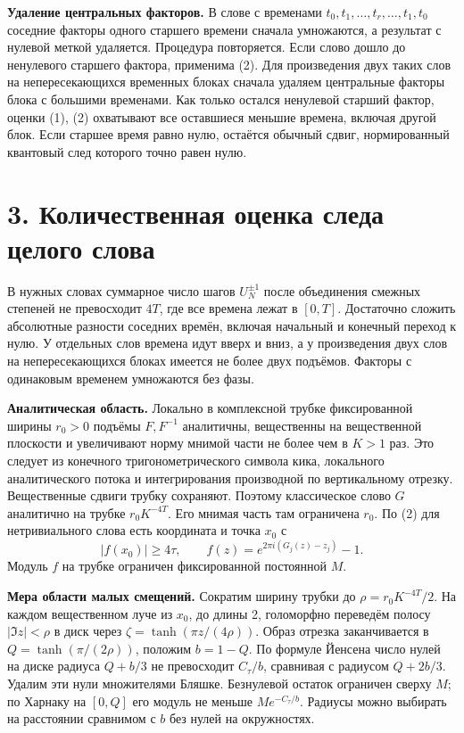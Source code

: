 \documentclass[11pt,a4paper]{article}
\newcommand{\sect}[1]{\section*{\sffamily\color{ink}#1}}
\newcommand{\subt}[1]{\par\medskip\noindent\textbf{#1.}\quad}
\begin{document}
\subt{Удаление центральных факторов}
В слове с временами \(t_0,t_1,\ldots,t_r,\ldots,t_1,t_0\) соседние факторы одного старшего времени сначала умножаются, а результат с нулевой меткой удаляется. Процедура повторяется. Если слово дошло до ненулевого старшего фактора, применима (2). Для произведения двух таких слов на непересекающихся временных блоках сначала удаляем центральные факторы блока с большими временами. Как только остался ненулевой старший фактор, оценки (1), (2) охватывают все оставшиеся меньшие времена, включая другой блок. Если старшее время равно нулю, остаётся обычный сдвиг, нормированный квантовый след которого точно равен нулю.

\newpage
\sect{3. Количественная оценка следа целого слова}
В нужных словах суммарное число шагов \(U_N^{\pm1}\) после объединения смежных степеней не превосходит \(4T\), где все времена лежат в \([0,T]\). Достаточно сложить абсолютные разности соседних времён, включая начальный и конечный переход к нулю. У отдельных слов времена идут вверх и вниз, а у произведения двух слов на непересекающихся блоках имеется не более двух подъёмов. Факторы с одинаковым временем умножаются без фазы.

\subt{Аналитическая область}
Локально в комплексной трубке фиксированной ширины \(r_0>0\) подъёмы \(F,F^{-1}\) аналитичны, вещественны на вещественной плоскости и увеличивают норму мнимой части не более чем в \(K>1\) раз. Это следует из конечного тригонометрического символа кика, локального аналитического потока и интегрирования производной по вертикальному отрезку. Вещественные сдвиги трубку сохраняют. Поэтому классическое слово \(G\) аналитично на трубке \(r_0 K^{-4T}\). Его мнимая часть там ограничена \(r_0\). По (2) для нетривиального слова есть координата и точка \(x_0\) с
\[
           |f(x_0)|\ge 4\tau,\qquad
        f(z)=e^{2\pi i(G_j(z)-z_j)}-1.
\]
Модуль \(f\) на трубке ограничен фиксированной постоянной \(M\).

\subt{Мера области малых смещений}
Сократим ширину трубки до \(\rho=r_0K^{-4T}/2\). На каждом вещественном луче из \(x_0\), до длины 2, голоморфно переведём полосу \(|\Im z|<\rho\) в диск через \(\zeta=\tanh(\pi z/(4\rho))\). Образ отрезка заканчивается в \(Q=\tanh(\pi/(2\rho))\), положим \(b=1-Q\). По формуле Йенсена число нулей на диске радиуса \(Q+b/3\) не превосходит \(C_\tau/b\), сравнивая с радиусом \(Q+2b/3\). Удалим эти нули множителями Бляшке. Безнулевой остаток ограничен сверху \(M\); по Харнаку на \([0,Q]\) его модуль не меньше \(M e^{-C_\tau/b}\). Радиусы можно выбирать на расстоянии сравнимом с \(b\) без нулей на окружностях.
\end{document}
